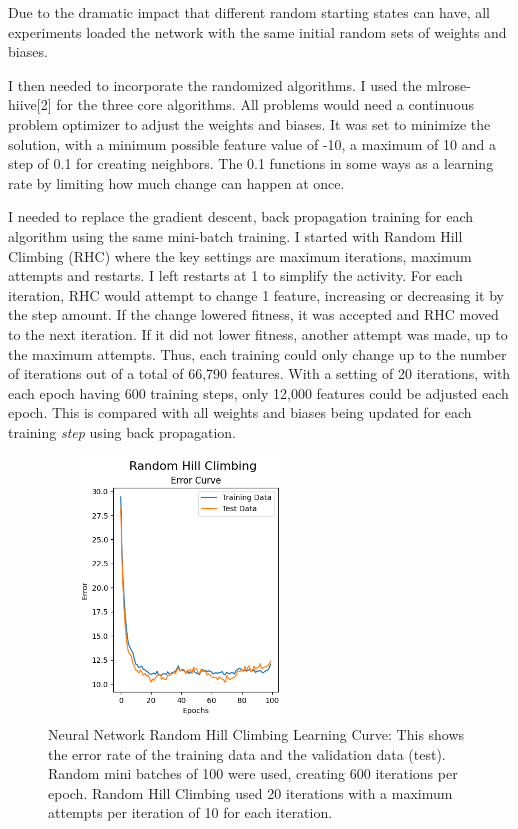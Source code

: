 \documentclass[letterpaper]{article} %
\begin{document}
Due to the dramatic impact that different random starting states can have, all experiments loaded the network with the same initial random sets of weights and biases.

I then needed to incorporate the randomized algorithms. I used the mlrose-hiive[2] for the three core algorithms.  All problems would need a continuous problem optimizer to adjust the weights and biases. It was set to minimize the solution, with a minimum possible feature value of -10, a maximum of 10 and a step of 0.1 for creating neighbors.  The 0.1 functions in some ways as a learning rate by limiting how much change can happen at once.  

I needed to replace the gradient descent, back propagation training for each algorithm using the same mini-batch training. I started with Random Hill Climbing (RHC) where the key settings are maximum iterations, maximum attempts and restarts.  I left restarts at 1 to simplify the activity.  For each iteration, RHC would attempt to change 1 feature, increasing or decreasing it by the step amount.  If the change lowered fitness, it was accepted and RHC moved to the next iteration.  If it did not lower fitness, another attempt was made, up to the maximum attempts.  Thus, each training could only change up to the number of iterations out of a total of 66,790 features.  With a setting of 20 iterations, with each epoch having 600 training steps, only 12,000 features could be adjusted each epoch.  This is compared with all weights and biases being updated for each training \emph{step} using back propagation.

\begin{figure}[!htb]
\centering
\includegraphics[width=2.75in, height=2.75in]{figures/Random_Hill_Climbing__algorithm_rhc_epochs_100_restart_1_max_iters_20_max_attempts_10_seed_1_capture_iteration_values_False_Error_Curve.png}
\caption{Neural Network Random Hill Climbing Learning Curve: This shows the error rate of the training data and the validation data (test).  Random mini batches of 100 were used, creating 600 iterations per epoch.  Random Hill Climbing used 20 iterations with a maximum attempts per iteration of 10 for each iteration.  }
\label{fig:nn_rhc_initial}
\end{figure}
\end{document}
